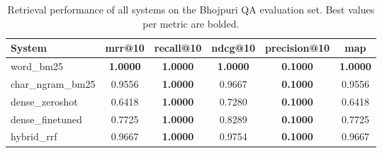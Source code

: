 \begin{table}[ht]
\centering
\caption{Retrieval performance of all systems on the Bhojpuri QA evaluation set. Best values per metric are bolded.}
\label{tab:main_results}
\begin{tabular}{lccccc}
\toprule
\textbf{System} & \textbf{mrr@10} & \textbf{recall@10} & \textbf{ndcg@10} & \textbf{precision@10} & \textbf{map} \\
\midrule
word\_bm25 & \textbf{1.0000} & \textbf{1.0000} & \textbf{1.0000} & \textbf{0.1000} & \textbf{1.0000} \\
char\_ngram\_bm25 & 0.9556 & \textbf{1.0000} & 0.9667 & \textbf{0.1000} & 0.9556 \\
dense\_zeroshot & 0.6418 & \textbf{1.0000} & 0.7280 & \textbf{0.1000} & 0.6418 \\
dense\_finetuned & 0.7725 & \textbf{1.0000} & 0.8289 & \textbf{0.1000} & 0.7725 \\
hybrid\_rrf & 0.9667 & \textbf{1.0000} & 0.9754 & \textbf{0.1000} & 0.9667 \\
\bottomrule
\end{tabular}
\end{table}